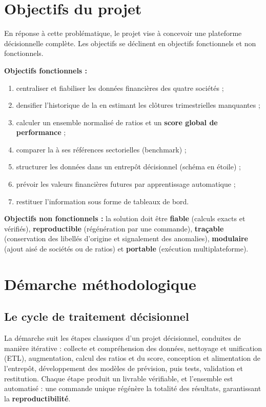 \section{Objectifs du projet}
\label{sec:objectifs}
\par En réponse à cette problématique, le projet vise à concevoir une plateforme
décisionnelle complète. Les objectifs se déclinent en objectifs fonctionnels et
non fonctionnels.

\par \textbf{Objectifs fonctionnels :}
\begin{enumerate}[noitemsep]
  \item centraliser et fiabiliser les données financières des quatre sociétés ;
  \item densifier l'historique de la \sfbt en estimant les clôtures
        trimestrielles manquantes ;
  \item calculer un ensemble normalisé de ratios et un \textbf{score global de
        performance} ;
  \item comparer la \sfbt à ses références sectorielles (benchmark) ;
  \item structurer les données dans un entrepôt décisionnel (schéma en étoile) ;
  \item prévoir les valeurs financières futures par apprentissage automatique ;
  \item restituer l'information sous forme de tableaux de bord.
\end{enumerate}

\par \textbf{Objectifs non fonctionnels :} la solution doit être \textbf{fiable}
(calculs exacts et vérifiés), \textbf{reproductible} (régénération par une
commande), \textbf{traçable} (conservation des libellés d'origine et signalement
des anomalies), \textbf{modulaire} (ajout aisé de sociétés ou de ratios) et
\textbf{portable} (exécution multiplateforme).

\section{Démarche méthodologique}
\label{sec:methodo}

\subsection{Le cycle de traitement décisionnel}
\par La démarche suit les étapes classiques d'un projet décisionnel, conduites de
manière itérative : collecte et compréhension des données, nettoyage et
unification (\ac{ETL}), augmentation, calcul des ratios et du score, conception et
alimentation de l'entrepôt, développement des modèles de prévision, puis tests,
validation et restitution. Chaque étape produit un livrable vérifiable, et
l'ensemble est automatisé : une commande unique régénère la totalité des
résultats, garantissant la \textbf{reproductibilité}.

